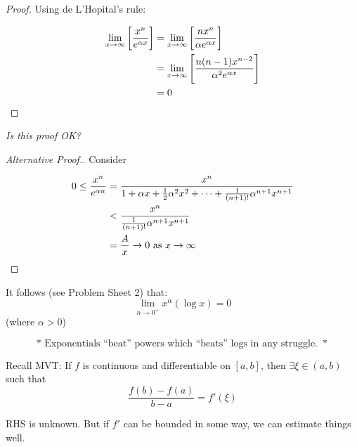 \documentclass[10pt]{scrartcl}
\begin{document}
\begin{proof}Using de L'Hopital's rule: 

\begin{align*}
  \lim_{x \to \infty}\left[\frac{x^n}{e^{\alpha x}}\right] 
  &= \lim_{x \to \infty} \left[\frac{nx^n}{\alpha e^{\alpha x}}\right]\\
  &= \lim_{x \to \infty}\left[\frac{n(n-1)x^{n-2}}{\alpha^2e^{\alpha x}}\right]\\
  &= 0\qedhere
\end{align*}

\end{proof}
\emph{Is this proof OK?}

\begin{proof}[Alternative Proof.]
Consider 

\begin{align*}
  0 \leq \frac{x^n}{e^{\alpha n}} &= \frac{x^n}{1 + \alpha x + \frac{1}{2}\alpha^2x^2 + \dots + \frac{1}{(n+1)!}\alpha^{n+1}x^{n+1}}\\
  &< \frac{x^n}{\frac{1}{(n+1)!}\alpha^{n+1}x^{n+1}}\\
  &= \frac{A}{x} \to 0 \text{ as } x \to \infty \qedhere
\end{align*}
\end{proof}

It follows (see Problem Sheet 2) that: 
\[\lim_{n \to 0^+} x^{\alpha}(\log x) = 0\]
(where $\alpha > 0$)

\[\boxed{* \text{ Exponentials ``beat'' powers which ``beats'' logs in any struggle. } *}\]\vspace*{5pt}



Recall MVT: If $f$ is continuous and differentiable on $[a,b]$, then $\exists \xi \in (a,b)$ such that
\[\frac{f(b)-f(a)}{b-a} = f'(\xi)\]

RHS is unknown. But if $f'$ can be bounded in some way, we can estimate things well.\\
\end{document}

